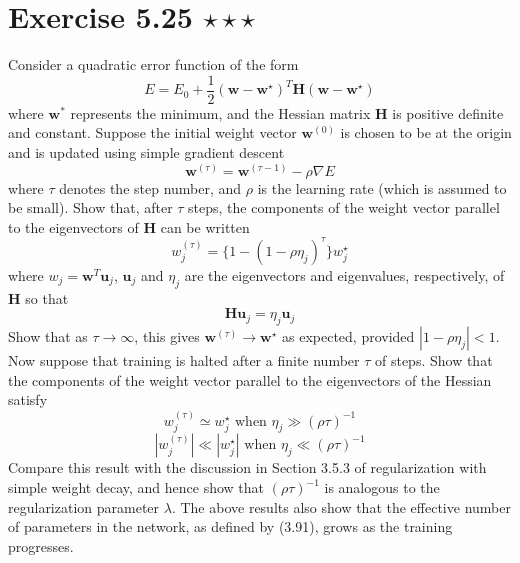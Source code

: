 \section*{Exercise 5.25 $\star \star \star$}
Consider a quadratic error function of the form
 \begin{equation*}
     E = E_0 + \frac{1}{2}(\mathbf{w} - \mathbf{w}^\star)^T 
     \mathbf{H} (\mathbf{w} - \mathbf{w}^\star)
    \tag{5.195}\label{eq:5.195}
\end{equation*}
where $\mathbf{w}^*$ represents the minimum, and the Hessian matrix $\mathbf{H}$ is positive
definite and constant. Suppose the initial weight vector $\mathbf{w}^{(0)}$ is chosen to be at the
origin and is updated using simple gradient descent
\begin{equation*}
    \mathbf{w}^{(\tau)} = \mathbf{w}^{(\tau - 1)} - \rho \nabla E
    \tag{5.196}\label{eq:5.196}
\end{equation*}
where $\tau$ denotes the step number, and $\rho$ is the learning
rate (which is assumed to be small). Show that, after $\tau$ steps,
the components of the weight vector parallel to the eigenvectors of 
 $\mathbf{H}$ can be written
 \begin{equation*}
     w_j^{(\tau)} = \{1 - (1 - \rho \eta_j)^\tau\} w_j^\star
    \tag{5.197}\label{eq:5.197}
 \end{equation*}
 where $w_j = \mathbf{w}^T \mathbf{u}_j$, $\mathbf{u}_j$ and $\eta_j$ are the eigenvectors and eigenvalues,
 respectively, of $\mathbf{H}$ so that
 \begin{equation*}
    \mathbf{H}\mathbf{u}_j = \eta_j \mathbf{u}_j
    \tag{5.198}\label{eq:5.198}
 \end{equation*}
 Show that as $\tau \to \infty$, this gives $\mathbf{w}^{(\tau)} \to \mathbf{w}^\star$ as expected,
 provided $|1 - \rho \eta_j| < 1$. Now suppose that training is halted after a finite number $\tau$ 
 of steps. Show that the components of the weight vector parallel to the eigenvectors of the
 Hessian satisfy 
 \begin{equation*}
     w_j^{(\tau)} \simeq w_j^\star \text{ when } \eta_j \gg (\rho \tau)^{-1}
    \tag{5.199}\label{eq:5.199}
\end{equation*}
\begin{equation*}
     |w_j^{(\tau)}| \ll |w_j^\star| \text{ when } \eta_j \ll (\rho \tau)^{-1}
    \tag{5.200}\label{eq:5.200}
\end{equation*}
Compare this result with the discussion in Section 3.5.3 of regularization with simple
weight decay, and hence show that $(\rho \tau)^{-1}$ is analogous to the regularization
parameter $\lambda$. The above results also show that the effective number of parameters in the 
network, as defined by (3.91), grows as the training progresses.

